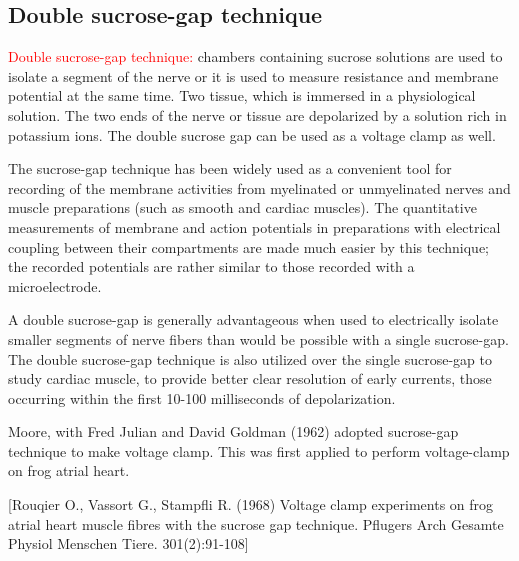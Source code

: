 \subsection{Double sucrose-gap technique}
\label{sec:double-sucrose-gap-technique}

\textcolor{red}{Double sucrose-gap technique:}
chambers containing sucrose solutions are used to isolate a segment of the nerve
or it is used to measure resistance and membrane potential at the same time. Two
tissue, which is immersed in a physiological solution. The two ends of the nerve
or tissue are depolarized by a solution rich in potassium ions.
The double sucrose gap can be used as a voltage clamp as well.


The sucrose-gap technique has been widely used as a convenient tool for
recording of the membrane activities from myelinated or unmyelinated nerves and
muscle preparations (such as smooth and cardiac muscles). The quantitative
measurements of membrane and action potentials in preparations with electrical
coupling between their compartments are made much easier by this technique; the
recorded potentials are rather similar to those recorded with a microelectrode.


A double sucrose-gap is generally advantageous when used to electrically isolate
smaller segments of nerve fibers than would be possible with a single
sucrose-gap. The double sucrose-gap technique is also utilized over the single
sucrose-gap to study cardiac muscle, to provide better clear resolution of early
currents, those occurring within the first 10-100 milliseconds of
depolarization.

Moore, with Fred Julian and David Goldman (1962) adopted sucrose-gap technique
to make voltage clamp. This was first applied to perform voltage-clamp on frog
atrial heart.

[Rouqier O., Vassort G., Stampfli R. (1968) Voltage clamp experiments on frog
atrial heart muscle fibres with the sucrose gap technique. Pflugers Arch Gesamte
Physiol Menschen Tiere. 301(2):91-108]





% 

